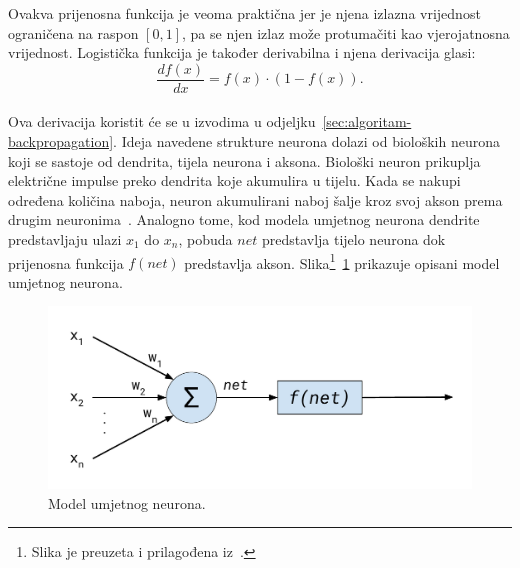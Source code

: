 \newpage
\noindent
Ovakva prijenosna funkcija je veoma praktična jer je njena izlazna vrijednost ograničena na raspon $[0, 1]$, pa se njen
izlaz može protumačiti kao vjerojatnosna vrijednost. Logistička funkcija je također derivabilna i njena derivacija
glasi:\\
\begin{equation}
    \frac{df(x)}{dx} = f(x) \cdot (1 - f(x)).\label{eq:logistic-derivation}
\end{equation}\\
Ova derivacija koristit će se u izvodima u odjeljku\ \ref{sec:algoritam-backpropagation}.
Ideja navedene strukture neurona dolazi od bioloških neurona koji se sastoje od dendrita, tijela neurona i
aksona. Biološki neuron prikuplja električne impulse preko dendrita koje akumulira u tijelu. Kada se nakupi određena
količina naboja, neuron akumulirani naboj šalje kroz svoj akson prema drugim neuronima\ \citep{cupic2013}. Analogno
tome, kod modela umjetnog neurona dendrite predstavljaju ulazi $x_1$ do $x_n$, pobuda $net$ predstavlja tijelo neurona
dok prijenosna funkcija $f(net)$ predstavlja akson. Slika\footnote{Slika je preuzeta i prilagođena
iz\ \citep{cupic2013}.}\ \ref{fig:artificial-neuron-model} prikazuje opisani model umjetnog neurona.
\begin{figure}[!htb]
    \centering
    \includegraphics[width=12cm]{images/chapter3/artificial-neuron-model.pdf}
    \caption{Model umjetnog neurona.}
    \label{fig:artificial-neuron-model}
\end{figure}

